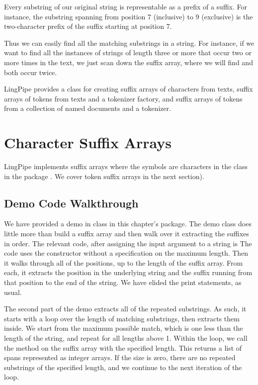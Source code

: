 Every substring of our original string is representable as a prefix
of a suffix.  For instance, the substring  spanning
from position 7 (inclusive) to 9 (exclusive) is the two-character
prefix of the suffix  starting at position 7.

Thus we can easily find all the matching substrings in a string.  For
instance, if we want to find all the instances of strings of length
three or more that occur two or more times in the text, we just scan
down the suffix array, where we will find  and
 both occur twice.  

LingPipe provides a class for creating suffix arrays of characters
from texts, suffix arrays of tokens from texts and a tokenizer
factory, and suffix arrays of tokens from a collection of named
documents and a tokenizer.


\section{Character Suffix Arrays}

LingPipe implements suffix arrays where the symbols are characters in
the class  in the package
.  We cover token suffix arrays in the
next section).

\subsection{Demo Code Walkthrough}

We have provided a demo in class  in this
chapter's package.  The demo class does little more than build a
suffix array and then walk over it extracting the suffixes in order.
The relevant code, after assigning the input argument to a string
 is
%
%
The code uses the constructor without a specification on the maximum
length.  Then it walks through all of the positions, up to the length
of the suffix array.  From each, it extracts the position in the
underlying string and the suffix running from that position to the end
of the string.  We have elided the print statements, as usual.

The second part of the demo extracts all of the repeated substrings.
As such, it starts with a loop over the length of matching substrings,
then extracts them inside.
%
%
We start from the maximum possible match, which is one less
than the length of the string, and repeat for all lengths above 1.
Within the loop, we call the  method on the
suffix array with the specified length.  This returns a list of
spans represented as integer arrays.  If the size is zero, there
are no repeated substrings of the specified length, and we continue
to the next iteration of the loop.  

